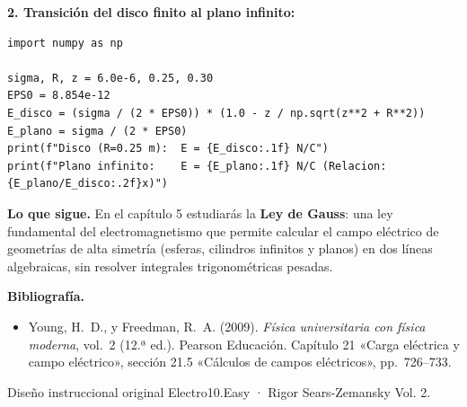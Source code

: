 \documentclass[11pt]{article}
\begin{document}
\textbf{2. Transición del disco finito al plano infinito:}
\begin{lstlisting}[style=e10python]
import numpy as np

sigma, R, z = 6.0e-6, 0.25, 0.30
EPS0 = 8.854e-12
E_disco = (sigma / (2 * EPS0)) * (1.0 - z / np.sqrt(z**2 + R**2))
E_plano = sigma / (2 * EPS0)
print(f"Disco (R=0.25 m):  E = {E_disco:.1f} N/C")
print(f"Plano infinito:    E = {E_plano:.1f} N/C (Relacion: {E_plano/E_disco:.2f}x)")
\end{lstlisting}


\medskip
{}

\medskip
{}

\begin{eConsejo}\textbf{Lo que sigue.} En el capítulo 5 estudiarás la \textbf{Ley de Gauss}: una ley fundamental del electromagnetismo que permite calcular el campo eléctrico de geometrías de alta simetría (esferas, cilindros infinitos y planos) en dos líneas algebraicas, sin resolver integrales trigonométricas pesadas.\end{eConsejo}

{\small\textbf{Bibliografía.}
\begin{itemize}[leftmargin=*,itemsep=2pt,topsep=2pt]
  \item Young, H.~D., y Freedman, R.~A. (2009). \emph{Física universitaria con física moderna}, vol.~2 (12.ª ed.). Pearson Educación. Capítulo 21 «Carga eléctrica y campo eléctrico», sección 21.5 «Cálculos de campos eléctricos», pp.~726--733.
\end{itemize}
{\color{e10muted}Diseño instruccional original Electro10.Easy · Rigor Sears-Zemansky Vol. 2.}}
\end{document}
